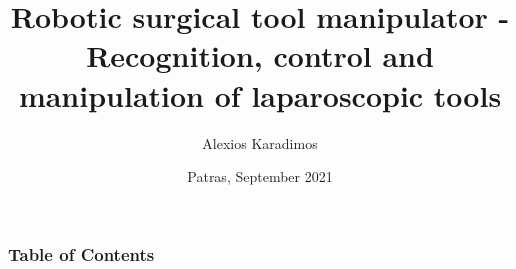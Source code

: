 \documentclass{beamer}
\title[Robotic surgical tool manipulator]{Robotic surgical tool manipulator - Recognition, control and manipulation of laparoscopic tools}
\author{Alexios Karadimos}
\institute[ECE U. Patras]{Deparment of Electrical and Computer Engineering}
\date{Patras, September 2021}
\begin{document}


\frame{\titlepage}

\begin{frame}
\frametitle{Table of Contents}
\tableofcontents
\end{frame}











\end{document}
